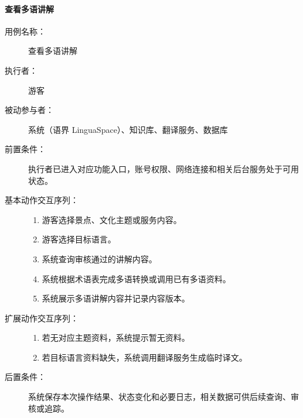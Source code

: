 \paragraph{查看多语讲解}
\begin{description}
  \item[用例名称：] 查看多语讲解
  \item[执行者：] 游客
  \item[被动参与者：] 系统（语界 LinguaSpace）、知识库、翻译服务、数据库
  \item[前置条件：] 执行者已进入对应功能入口，账号权限、网络连接和相关后台服务处于可用状态。
  \item[基本动作交互序列：]
  \begin{enumerate}
    \item 游客选择景点、文化主题或服务内容。
    \item 游客选择目标语言。
    \item 系统查询审核通过的讲解内容。
    \item 系统根据术语表完成多语转换或调用已有多语资料。
    \item 系统展示多语讲解内容并记录内容版本。
  \end{enumerate}
  \item[扩展动作交互序列：]
  \begin{enumerate}
    \item[3a.] 若无对应主题资料，系统提示暂无资料。
    \item[4a.] 若目标语言资料缺失，系统调用翻译服务生成临时译文。
  \end{enumerate}
  \item[后置条件：] 系统保存本次操作结果、状态变化和必要日志，相关数据可供后续查询、审核或追踪。
\end{description}

